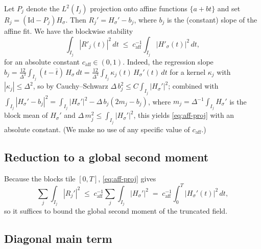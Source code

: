 Let $P_j$ denote the $L^2(I_j)$ projection onto affine functions
$\{a+bt\}$ and set $R_j=(\mathrm{Id}-P_j)H_\sigma$.  Then $R_j'=H_\sigma'-b_j$,
where $b_j$ is the (constant) slope of the affine fit.  We have the blockwise
stability
\begin{equation}
\int_{I_j} |R'_j(t)|^2\,dt
\;\le\;
c_{\mathrm{aff}}^{-1}\int_{I_j} |H'_\sigma(t)|^2\,dt,
\label{eq:aff-proj}
\end{equation}
for an absolute constant $c_{\mathrm{aff}}\in(0,1)$.  Indeed, the regression slope
$b_j=\frac{12}{\Delta^3}\int_{I_j}(t-\bar t)\,H_\sigma\,dt
=\frac{12}{\Delta^3}\int_{I_j}\kappa_j(t)\,H_\sigma'(t)\,dt$ for a kernel
$\kappa_j$ with $|\kappa_j|\le\Delta^2$, so by Cauchy--Schwarz
$\Delta\,b_j^2\le C\int_{I_j}|H_\sigma'|^2$; combined with
$\int_{I_j}|H_\sigma'-b_j|^2=\int_{I_j}|H_\sigma'|^2-\Delta\,b_j(2m_j-b_j)$,
where $m_j=\Delta^{-1}\!\int_{I_j}H_\sigma'$ is the block mean of $H_\sigma'$ and
$\Delta\,m_j^2\le\int_{I_j}|H_\sigma'|^2$, this yields \eqref{eq:aff-proj} with an
absolute constant.  (We make no use of any specific value of $c_{\mathrm{aff}}$.)

\subsection{Reduction to a global second moment}

Because the blocks tile $[0,T]$, \eqref{eq:aff-proj} gives
\begin{equation}
\sum_j\int_{I_j}|R_j'|^2
\;\le\; c_{\mathrm{aff}}^{-1}\sum_j\int_{I_j}|H_\sigma'|^2
\;=\; c_{\mathrm{aff}}^{-1}\int_0^T|H_\sigma'(t)|^2\,dt,
\label{eq:reduce-global}
\end{equation}
so it suffices to bound the global second moment of the truncated field.

\subsection{Diagonal main term}


